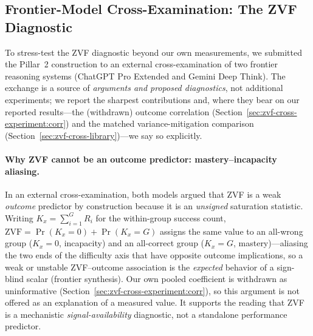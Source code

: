 %

\subsection{Frontier-Model Cross-Examination: The ZVF Diagnostic}
\label{sec:frontier-zvf}

To stress-test the ZVF diagnostic beyond our own measurements, we
submitted the Pillar~2 construction to an external cross-examination of
two frontier reasoning systems (ChatGPT Pro Extended and Gemini Deep
Think). The exchange is a source of \emph{arguments and proposed
diagnostics}, not additional experiments; we report the sharpest
contributions and, where they bear on our reported results---the
(withdrawn) outcome correlation (Section~\ref{sec:zvf-cross-experiment:corr})
and the matched variance-mitigation comparison
(Section~\ref{sec:zvf-cross-library})---we say so explicitly.

\paragraph{Why ZVF cannot be an outcome predictor: mastery--incapacity aliasing.}
In an external cross-examination, both models argued that ZVF is a weak
\emph{outcome} predictor by construction because it is an \emph{unsigned}
saturation statistic. Writing $K_x=\sum_{i=1}^{G} R_i$ for the within-group
success count, $\mathrm{ZVF}=\Pr(K_x=0)+\Pr(K_x=G)$ assigns the same value
to an all-wrong group ($K_x=0$, incapacity) and an all-correct group
($K_x=G$, mastery)---aliasing the two ends of the difficulty axis that
have opposite outcome implications, so a weak or unstable ZVF--outcome
association is the \emph{expected} behavior of a sign-blind scalar (frontier
synthesis). Our own pooled coefficient is withdrawn as uninformative
(Section~\ref{sec:zvf-cross-experiment:corr}), so this argument is not
offered as an explanation of a measured value. It supports the reading that ZVF is a mechanistic \emph{signal-availability}
diagnostic, not a standalone performance predictor.

